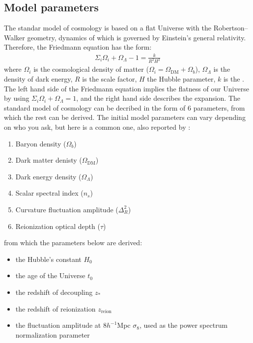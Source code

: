 \documentclass[paper=a4, fontsize=11pt]{scrartcl} %
\numberwithin{equation}{section} %
\numberwithin{figure}{section} %
\numberwithin{table}{section} %
\begin{document}
\subsection{Model parameters}
The standar model of cosmology is based on a flat Universe with the Robertson--Walker geometry, dynamics of which is governed by Einstein's general relativity. Therefore, the Friedmann equation has the form:
\begin{eqnarray}
\Sigma_i \Omega_i + \Omega_\Lambda - 1 = \frac{k}{R^2H^2}
\end{eqnarray}
where $\Omega_i$ is the cosmological density of matter ($\Omega_i = \Omega_\mathrm{DM} + \Omega_b$), $\Omega_\Lambda$ is the density of dark energy, $R$ is the scale factor, $H$ the Hubble parameter, $k$ is the . The left hand side of the Friedmann equation implies the flatness of our Universe by using $\Sigma_i \Omega_i + \Omega_\Lambda = 1$, and the right hand side describes the expansion. The standard model of cosmology can be decribed in the form of 6 parameters, from which the rest can be derived. The initial model parameters can vary depending on who you ask, but here is a common one, also reported by \citet[][]{Planck2014}:
\begin{enumerate}
\item Baryon density ($\Omega_b$)
\item Dark matter denisty ($\Omega_\mathrm{DM}$)
\item Dark energy density ($\Omega_\Lambda$)
\item Scalar spectral index ($n_s$)
\item Curvature fluctuation amplitude ($\Delta_R^2$)
\item Reionization optical depth ($\tau$)
\end{enumerate}
from which the parameters below are derived:
\begin{itemize}
\item the Hubble's constant $H_0$
\item the age of the Universe $t_0$
\item the redshift of decoupling $z_*$
\item the redshift of reionization $z_\mathrm{reion}$
\item the fluctuation amplitude at $8 h^{-1}$Mpc $\sigma_8$, used as the power spectrum normalization parameter 
\end{itemize}

\end{document}
